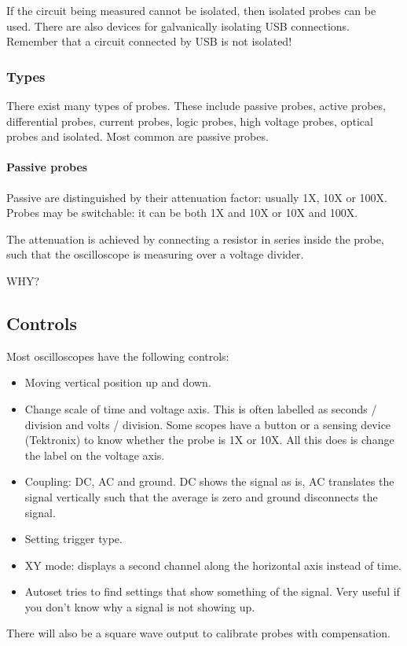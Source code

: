 If the circuit being measured cannot be isolated, then isolated probes can be used. There are also devices for galvanically isolating USB connections. Remember that a circuit connected by USB is not isolated!
\subsubsection{Types}
There exist many types of probes. These include passive probes, active probes, differential probes, current probes, logic probes, high voltage probes, optical probes and isolated. Most common are passive probes.
\paragraph{Passive probes} Passive are distinguished by their attenuation factor: usually 1X, 10X or 100X. Probes may be switchable: it can be both 1X and 10X or 10X and 100X.

The attenuation is achieved by connecting a resistor in series inside the probe, such that the oscilloscope is measuring over a voltage divider.

WHY?

\subsection{Controls}
Most oscilloscopes have the following controls:
\begin{itemize}
\item Moving vertical position up and down.
\item Change scale of time and voltage axis. This is often labelled as seconds / division and volts / division. Some scopes have a button or a sensing device (Tektronix) to know whether the probe is 1X or 10X. All this does is change the label on the voltage axis.
\item Coupling: DC, AC and ground. DC shows the signal as is, AC translates the signal vertically such that the average is zero and ground disconnects the signal.
\item Setting trigger type.
\item XY mode: displays a second channel along the horizontal axis instead of time.
\item Autoset tries to find settings that show something of the signal. Very useful if you don't know why a signal is not showing up.
\end{itemize}
There will also be a square wave output to calibrate probes with compensation.
